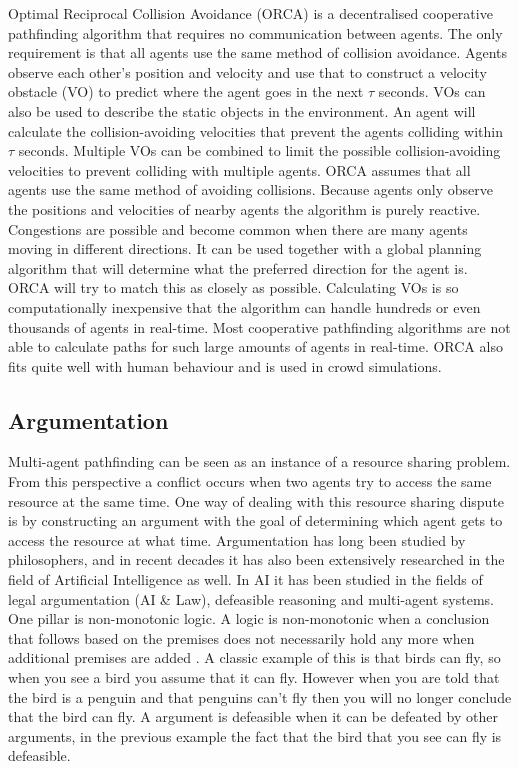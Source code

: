 Optimal Reciprocal Collision Avoidance (ORCA) \cite{vandenberg2011} is a
decentralised cooperative pathfinding algorithm that requires no communication
between agents. The only requirement is that all agents use the same method of
collision avoidance. Agents observe each other's position and velocity and use
that to construct a velocity obstacle (VO) to predict where the agent goes in
the next $\tau$ seconds. VOs can also be used to describe the static objects in
the environment. An agent will calculate the collision-avoiding velocities that
prevent the agents colliding within $\tau$ seconds. Multiple VOs can be
combined to limit the possible collision-avoiding velocities to prevent
colliding with multiple agents. ORCA assumes that all agents use the same
method of avoiding collisions. Because agents only observe the positions and
velocities of nearby agents the algorithm is purely reactive. Congestions are
possible and become common when there are many agents moving in different
directions. It can be used together with a global planning algorithm that will
determine what the preferred direction for the agent is. ORCA will try to
match this as closely as possible. Calculating VOs is so computationally
inexpensive that the algorithm can handle hundreds or even thousands of agents
in real-time. Most cooperative pathfinding algorithms are not able to calculate
paths for such large amounts of agents in real-time. ORCA
also fits quite well with human behaviour and is used in crowd simulations.

\subsection{Argumentation}
Multi-agent pathfinding can be seen as an instance of a resource sharing
problem. From this perspective a conflict occurs when two agents try to access
the same resource at the same time. One way of dealing with this resource
sharing dispute is by constructing an argument with the goal of determining
which agent gets to access the resource at what time. Argumentation has long
been studied by philosophers, and in recent decades it has also been
extensively researched in
the field of Artificial Intelligence as well. In AI it has been studied
in the fields of legal argumentation (AI \& Law), defeasible reasoning and
multi-agent systems. One pillar is non-monotonic logic. A logic is
non-monotonic when a conclusion that follows based on the premises does not
necessarily hold any more when additional premises are added
\cite{vaneemeren2014,modgil2013}. A classic example of this is that birds can
fly, so when
you see a bird you assume that it can fly. However when you are told that the
bird is a penguin and that penguins can't fly then you will no longer conclude
that the bird can fly. A argument is defeasible when it can be defeated by
other arguments, in the previous example the fact that the bird that you see
can fly is defeasible.

